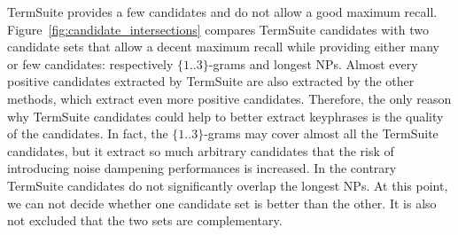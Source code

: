       TermSuite provides a few candidates and do not allow a good maximum
      recall. Figure~\ref{fig:candidate_intersections} compares TermSuite
      candidates with two candidate sets that allow a decent maximum recall
      while providing either many or few candidates: respectively
      $\{1..3\}$-grams and longest NPs. Almost every positive candidates
      extracted by TermSuite are also extracted by the other methods, which
      extract even more positive candidates. Therefore, the only reason why
      TermSuite candidates could help to better extract keyphrases is the
      quality of the candidates. In fact, the $\{1..3\}$-grams may cover almost
      all the TermSuite candidates, but it extract so much arbitrary candidates
      that the risk of introducing noise dampening performances is increased. In
      the contrary TermSuite candidates do not significantly overlap the longest
      NPs. At this point, we can not decide whether one candidate set is better
      than the other. It is also not excluded that the two sets are
      complementary.
